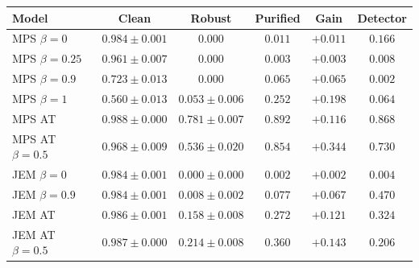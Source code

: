 \begin{tabular}{lccccc}
\toprule
Model & Clean & Robust & Purified & Gain & Detector \\
\midrule
MPS $\beta=0$ & $0.984 \pm 0.001$ & $0.000$ & $0.011$ & $+0.011$ & $0.166$ \\
MPS $\beta=0.25$ & $0.961 \pm 0.007$ & $0.000$ & $0.003$ & $+0.003$ & $0.008$ \\
MPS $\beta=0.9$ & $0.723 \pm 0.013$ & $0.000$ & $0.065$ & $+0.065$ & $0.002$ \\
MPS $\beta=1$ & $0.560 \pm 0.013$ & $0.053 \pm 0.006$ & $0.252$ & $+0.198$ & $0.064$ \\
MPS AT & $\mathbf{0.988 \pm 0.000}$ & $\mathbf{0.781 \pm 0.007}$ & $\mathbf{0.892}$ & $+0.116$ & $\mathbf{0.868}$ \\
MPS AT $\beta=0.5$ & $0.968 \pm 0.009$ & $0.536 \pm 0.020$ & $0.854$ & $\mathbf{+0.344}$ & $0.730$ \\
JEM $\beta=0$ & $0.984 \pm 0.001$ & $0.000 \pm 0.000$ & $0.002$ & $+0.002$ & $0.004$ \\
JEM $\beta=0.9$ & $0.984 \pm 0.001$ & $0.008 \pm 0.002$ & $0.077$ & $+0.067$ & $0.470$ \\
JEM AT & $0.986 \pm 0.001$ & $0.158 \pm 0.008$ & $0.272$ & $+0.121$ & $0.324$ \\
JEM AT $\beta=0.5$ & $0.987 \pm 0.000$ & $0.214 \pm 0.008$ & $0.360$ & $+0.143$ & $0.206$ \\
\bottomrule
\end{tabular}
